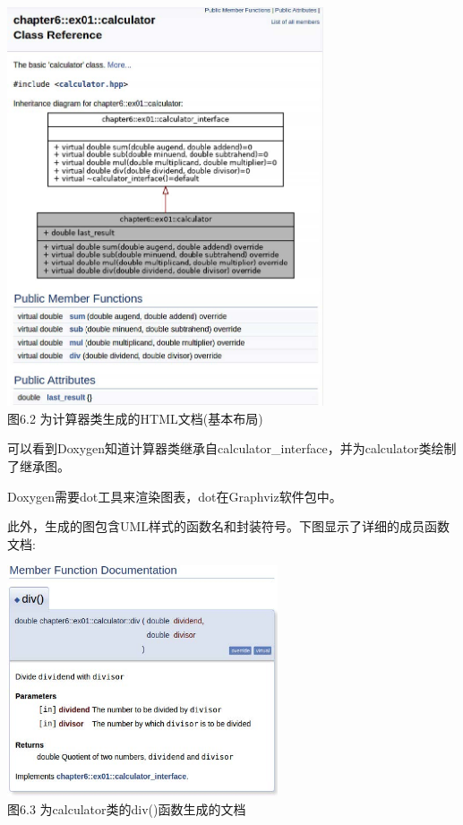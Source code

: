 \begin{center}
\includegraphics[width=0.7\textwidth]{content/2/chapter6/images/2.jpg}\\
图6.2 为计算器类生成的HTML文档(基本布局)
\end{center}

可以看到Doxygen知道计算器类继承自calculator\_interface，并为calculator类绘制了继承图。

\begin{tcolorbox}[colback=webgreen!5!white,colframe=webgreen!75!black,title=Note]
Doxygen需要dot工具来渲染图表，dot在Graphviz软件包中。
\end{tcolorbox}

此外，生成的图包含UML样式的函数名和封装符号。下图显示了详细的成员函数文档:

\begin{center}
\includegraphics[width=0.6\textwidth]{content/2/chapter6/images/3.jpg}\\
图6.3 为calculator类的div()函数生成的文档
\end{center}

